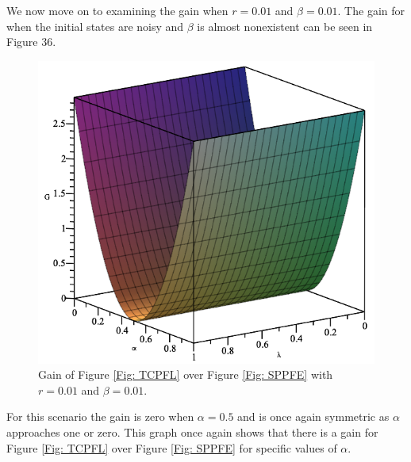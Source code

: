 \documentclass[twocolumn]{article}
\begin{document}
We now move on to examining the gain when $r=0.01$ and $\beta=0.01$. The gain for when the initial states are noisy and $\beta$ is almost nonexistent can be seen in Figure 36.
\begin{figure}[ht]
    \centering
    \includegraphics[scale=0.35]{Phase-Flip-Triple-Channel-r=001-Beta=001-Gain-Graph.png}
    \caption{\footnotesize{Gain of Figure \ref{Fig: TCPFL} over Figure \ref{Fig: SPPFE} with $r=0.01$ and $\beta=0.01$.}}
    \label{Fig: TCPFLGB} 
\end{figure}
\par \noindent
For this scenario the gain is zero when $\alpha=0.5$ and is once again symmetric as $\alpha$ approaches one or zero. This graph once again shows that there is a gain for Figure \ref{Fig: TCPFL} over Figure \ref{Fig: SPPFE} for specific values of $\alpha$.
\end{document}
